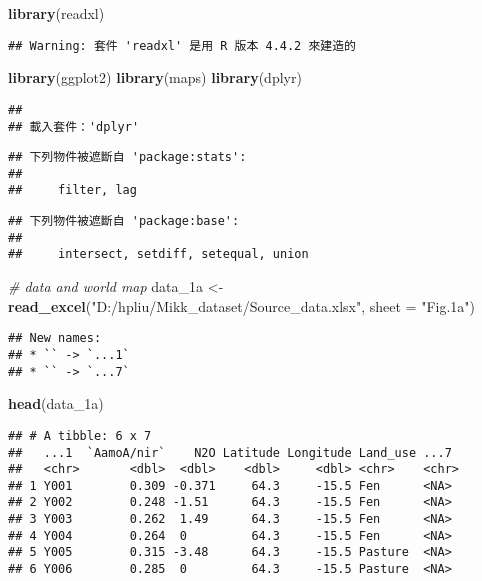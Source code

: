 \documentclass[
]{article}
\newenvironment{Shaded}{\begin{snugshade}}{\end{snugshade}}
\newcommand{\AttributeTok}[1]{\textcolor[rgb]{0.13,0.29,0.53}{#1}}
\newcommand{\CommentTok}[1]{\textcolor[rgb]{0.56,0.35,0.01}{\textit{#1}}}
\newcommand{\FunctionTok}[1]{\textcolor[rgb]{0.13,0.29,0.53}{\textbf{#1}}}
\newcommand{\NormalTok}[1]{#1}
\newcommand{\OtherTok}[1]{\textcolor[rgb]{0.56,0.35,0.01}{#1}}
\newcommand{\StringTok}[1]{\textcolor[rgb]{0.31,0.60,0.02}{#1}}
\begin{document}
\begin{Shaded}
\begin{Highlighting}[]
\FunctionTok{library}\NormalTok{(readxl)}
\end{Highlighting}
\end{Shaded}

\begin{verbatim}
## Warning: 套件 'readxl' 是用 R 版本 4.4.2 來建造的
\end{verbatim}

\begin{Shaded}
\begin{Highlighting}[]
\FunctionTok{library}\NormalTok{(ggplot2)}
\FunctionTok{library}\NormalTok{(maps)}
\FunctionTok{library}\NormalTok{(dplyr)}
\end{Highlighting}
\end{Shaded}

\begin{verbatim}
## 
## 載入套件：'dplyr'
\end{verbatim}

\begin{verbatim}
## 下列物件被遮斷自 'package:stats':
## 
##     filter, lag
\end{verbatim}

\begin{verbatim}
## 下列物件被遮斷自 'package:base':
## 
##     intersect, setdiff, setequal, union
\end{verbatim}

\begin{Shaded}
\begin{Highlighting}[]
\CommentTok{\# data and world map}
\NormalTok{data\_1a }\OtherTok{\textless{}{-}} \FunctionTok{read\_excel}\NormalTok{(}\StringTok{"D:/hpliu/Mikk\_dataset/Source\_data.xlsx"}\NormalTok{, }\AttributeTok{sheet =} \StringTok{"Fig.1a"}\NormalTok{)}
\end{Highlighting}
\end{Shaded}

\begin{verbatim}
## New names:
## * `` -> `...1`
## * `` -> `...7`
\end{verbatim}

\begin{Shaded}
\begin{Highlighting}[]
\FunctionTok{head}\NormalTok{(data\_1a)}
\end{Highlighting}
\end{Shaded}

\begin{verbatim}
## # A tibble: 6 x 7
##   ...1  `AamoA/nir`    N2O Latitude Longitude Land_use ...7 
##   <chr>       <dbl>  <dbl>    <dbl>     <dbl> <chr>    <chr>
## 1 Y001        0.309 -0.371     64.3     -15.5 Fen      <NA> 
## 2 Y002        0.248 -1.51      64.3     -15.5 Fen      <NA> 
## 3 Y003        0.262  1.49      64.3     -15.5 Fen      <NA> 
## 4 Y004        0.264  0         64.3     -15.5 Fen      <NA> 
## 5 Y005        0.315 -3.48      64.3     -15.5 Pasture  <NA> 
## 6 Y006        0.285  0         64.3     -15.5 Pasture  <NA>
\end{verbatim}
\end{document}
